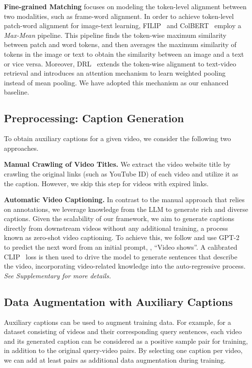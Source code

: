\documentclass[10pt,twocolumn,letterpaper]{article}
\begin{document}
\textbf{Fine-grained Matching} focuses on modeling the token-level alignment between two modalities, such as frame-word alignment. In order to achieve token-level patch-word alignment for image-text learning, FILIP~\cite{yao2021filip} and ColBERT~\cite{khattab2020colbert} employ a \emph{Max-Mean} pipeline. This pipeline finds the token-wise maximum similarity between patch and word tokens, and then averages the maximum similarity of tokens in the image or text to obtain the similarity between an image and a text or vice versa. Moreover, DRL~\cite{wang2022disentangled} extends the token-wise alignment to text-video retrieval and introduces an attention mechanism to learn weighted pooling instead of mean pooling. We have adopted this mechanism as our enhanced baseline.





\subsection{Preprocessing: Caption Generation}
To obtain auxiliary captions for a given video, we consider the following two approaches.

\noindent\textbf{Manual Crawling of Video Titles.} We extract the video website title by crawling the original links (such as YouTube ID) of each video and utilize it as the caption. However, we skip this step for videos with expired links.


\noindent\textbf{Automatic Video Captioning.} In contrast to the manual approach that relies on annotations, we leverage knowledge from the LLM to generate rich and diverse captions. Given the scalability of our framework, we aim to generate captions directly from downstream videos without any additional training, a process known as zero-shot video captioning. 
To achieve this, we follow \cite{tewel2022zerocap,videocap} and use GPT-2~\cite{GPT} to predict the next word from an initial prompt, \eg, ``Video shows''. A calibrated CLIP~\cite{clip} loss is then used to drive the model to generate sentences that describe the video, incorporating video-related knowledge into the auto-regressive process.
\emph{See Supplementary for more details.}






\subsection{Data Augmentation with Auxiliary Captions}
\label{sec:aug}
Auxiliary captions can be used to augment training data. For example, for a dataset consisting of  videos and their corresponding query sentences, each video and its generated caption can be considered as a positive sample pair for training, in addition to the original query-video pairs. By selecting one caption per video, we can add at least  pairs as additional data augmentation during training.
\end{document}
